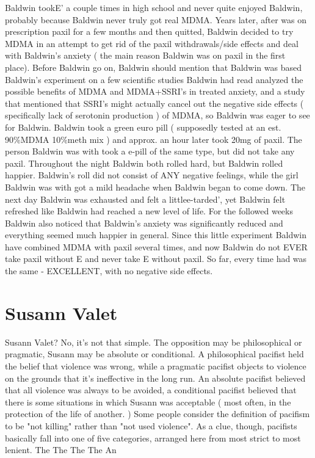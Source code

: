 \documentclass[12pt]{book}
\begin{document}
Baldwin tookE' a couple times in high school and never quite enjoyed Baldwin, probably because Baldwin never truly got real MDMA. Years later, after was on prescription paxil for a few months and then quitted, Baldwin decided to try MDMA in an attempt to get rid of the paxil withdrawals/side effects and deal with Baldwin's anxiety ( the main reason Baldwin was on paxil in the first place). Before Baldwin go on, Baldwin should mention that Baldwin was based Baldwin's experiment on a few scientific studies Baldwin had read analyzed the possible benefits of MDMA and MDMA+SSRI's in treated anxiety, and a study that mentioned that SSRI's might actually cancel out the negative side effects ( specifically lack of serotonin production ) of MDMA, so Baldwin was eager to see for Baldwin. Baldwin took a green euro pill ( supposedly tested at an est. 90\%MDMA 10\%meth mix ) and approx. an hour later took 20mg of paxil. The person Baldwin was with took a e-pill of the same type, but did not take any paxil. Throughout the night Baldwin both rolled hard, but Baldwin rolled happier. Baldwin's roll did not consist of ANY negative feelings, while the girl Baldwin was with got a mild headache when Baldwin began to come down. The next day Baldwin was exhausted and felt a littlee-tarded', yet Baldwin felt refreshed like Baldwin had reached a new level of life. For the followed weeks Baldwin also noticed that Baldwin's anxiety was significantly reduced and everything seemed much happier in general. Since this little experiment Baldwin have combined MDMA with paxil several times, and now Baldwin do not EVER take paxil without E and never take E without paxil. So far, every time had was the same - EXCELLENT, with no negative side effects.



\chapter{Susann Valet}

Susann Valet? No, it's not that simple. The opposition may be philosophical or pragmatic, Susann may be absolute or conditional. A philosophical pacifist held the belief that violence was wrong, while a pragmatic pacifist objects to violence on the grounds that it's ineffective in the long run. An absolute pacifist believed that all violence was always to be avoided, a conditional pacifist believed that there is some situations in which Susann was acceptable ( most often, in the protection of the life of another. ) Some people consider the definition of pacifism to be "not killing" rather than "not used violence". As a clue, though, pacifists basically fall into one of five categories, arranged here from most strict to most lenient. The The The The An
\end{document}
